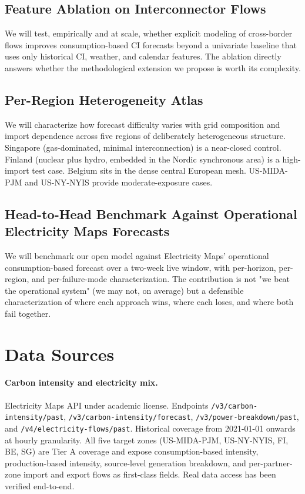 \documentclass[sigconf,nonacm]{acmart}
\begin{document}
\subsection{Feature Ablation on Interconnector Flows}
We will test, empirically and at scale, whether explicit modeling of cross-border flows improves consumption-based CI forecasts beyond a univariate baseline that uses only historical CI, weather, and calendar features. The ablation directly answers whether the methodological extension we propose is worth its complexity.

\subsection{Per-Region Heterogeneity Atlas}
We will characterize how forecast difficulty varies with grid composition and import dependence across five regions of deliberately heterogeneous structure. Singapore (gas-dominated, minimal interconnection) is a near-closed control. Finland (nuclear plus hydro, embedded in the Nordic synchronous area) is a high-import test case. Belgium sits in the dense central European mesh. US-MIDA-PJM and US-NY-NYIS provide moderate-exposure cases.

\subsection{Head-to-Head Benchmark Against Operational Electricity Maps Forecasts}
We will benchmark our open model against Electricity Maps' operational consumption-based forecast over a two-week live window, with per-horizon, per-region, and per-failure-mode characterization. The contribution is not "we beat the operational system" (we may not, on average) but a defensible characterization of where each approach wins, where each loses, and where both fail together.

\section{Data Sources}

\paragraph{Carbon intensity and electricity mix.} Electricity Maps API under academic license. Endpoints \texttt{/v3/carbon-intensity/past}, \texttt{/v3/carbon-intensity/forecast}, \texttt{/v3/power-breakdown/past}, and \texttt{/v4/electricity-flows/past}. Historical coverage from 2021-01-01 onwards at hourly granularity. All five target zones (US-MIDA-PJM, US-NY-NYIS, FI, BE, SG) are Tier A coverage and expose consumption-based intensity, production-based intensity, source-level generation breakdown, and per-partner-zone import and export flows as first-class fields. Real data access has been verified end-to-end.
\end{document}
